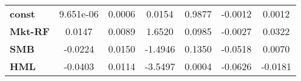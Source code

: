 \begin{center}
\begin{tabular}{lcccccc}
\midrule
\textbf{const}  &     9.651e-06      &       0.0006       &      0.0154     &      0.9877      &      -0.0012      &       0.0012       \\
\textbf{Mkt-RF} &       0.0147       &       0.0089       &      1.6520     &      0.0985      &      -0.0027      &       0.0322       \\
\textbf{SMB}    &      -0.0224       &       0.0150       &     -1.4946     &      0.1350      &      -0.0518      &       0.0070       \\
\textbf{HML}    &      -0.0403       &       0.0114       &     -3.5497     &      0.0004      &      -0.0626      &      -0.0181       \\
\bottomrule
\end{tabular}
\end{center}

